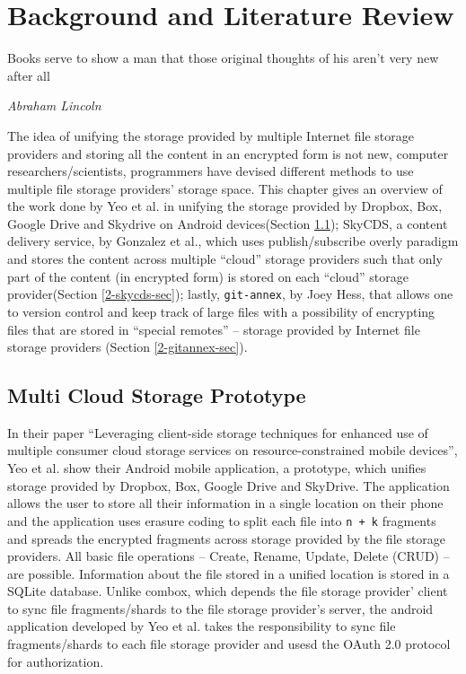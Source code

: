 \chapter{Background and Literature Review}

\epigraph{Books serve to show a man that those original thoughts of
  his aren't very new after all}{\textit{Abraham Lincoln}}

The idea of unifying the storage provided by multiple Internet file
storage providers and storing all the content in an encrypted form is
not new, computer researchers/scientists, programmers have devised
different methods to use multiple file storage providers' storage
space. This chapter gives an overview of the work done by Yeo et
al. in unifying the storage provided by Dropbox, Box, Google Drive and
Skydrive on Android devices\cite{yeo}(Section \ref{2-yeo-sec});
SkyCDS, a content delivery service, by Gonzalez et al., which uses
publish/subscribe overly paradigm and stores the content across
multiple ``cloud'' storage providers such that only part of the
content (in encrypted form) is stored on each ``cloud'' storage
provider\cite{skycds}(Section \ref{2-skycds-sec}); lastly,
\verb+git-annex+, by Joey Hess\cite{person:joeyh}, that allows one to
version control and keep track of large files with a possibility of
encrypting files that are stored in ``special remotes'' -- storage
provided by Internet file storage providers (Section
\ref{2-gitannex-sec}).

\section{Multi Cloud Storage Prototype}\label{2-yeo-sec}

In their paper ``Leveraging client-side storage techniques for
enhanced use of multiple consumer cloud storage services on
resource-constrained mobile devices'', Yeo et al. show their Android
mobile application, a prototype, which unifies storage provided by
Dropbox, Box, Google Drive and SkyDrive. The application allows the
user to store all their information in a single location on their
phone and the application uses erasure coding\cite{weatherspoon} to
split each file into \verb`n + k` fragments and spreads the encrypted
fragments across storage provided by the file storage providers. All
basic file operations -- Create, Rename, Update, Delete (CRUD) -- are
possible. Information about the file stored in a unified location is
stored in a SQLite database. Unlike combox, which depends the file
storage provider' client to sync file fragments/shards to the file
storage provider's server, the android application developed by Yeo et
al. takes the responsibility to sync file fragments/shards to each
file storage provider and usesd the OAuth 2.0\cite{protocol:oauth2}
protocol for authorization.

